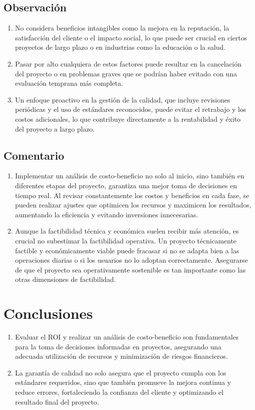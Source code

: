 \documentclass[12pt]{article}
\begin{document}
\subsection*{Observación}
\begin{enumerate}
    \item No considera beneficios intangibles como la mejora en la reputación, la satisfacción del cliente o el impacto social, lo que puede ser crucial en ciertos proyectos de largo plazo o en industrias como la educación o la salud. 
    \item  Pasar por alto cualquiera de estos factores puede resultar en la cancelación del proyecto o en problemas graves que se podrían haber evitado con una evaluación temprana más completa.
    \item Un enfoque proactivo en la gestión de la calidad, que incluye revisiones periódicas y el uso de estándares reconocidos, puede evitar el retrabajo y los costos adicionales, lo que contribuye directamente a la rentabilidad y éxito del proyecto a largo plazo.
\end{enumerate}

\subsection*{Comentario}
\begin{enumerate}
    \item Implementar un análisis de costo-beneficio no solo al inicio, sino también en diferentes etapas del proyecto, garantiza una mejor toma de decisiones en tiempo real. Al revisar constantemente los costos y beneficios en cada fase, se pueden realizar ajustes que optimicen los recursos y maximicen los resultados, aumentando la eficiencia y evitando inversiones innecesarias.
    \item Aunque la factibilidad técnica y económica suelen recibir más atención, es crucial no subestimar la factibilidad operativa. Un proyecto técnicamente factible y económicamente viable puede fracasar si no se adapta bien a las operaciones diarias o si los usuarios no lo adoptan correctamente. Asegurarse de que el proyecto sea operativamente sostenible es tan importante como las otras dimensiones de factibilidad.
\end{enumerate}

\section*{Conclusiones}
\begin{enumerate}
    \item Evaluar el ROI y realizar un análisis de costo-beneficio son fundamentales para la toma de decisiones informadas en proyectos, asegurando una adecuada utilización de recursos y minimización de riesgos financieros.
    \item La garantía de calidad no solo asegura que el proyecto cumpla con los estándares requeridos, sino que también promueve la mejora continua y reduce errores, fortaleciendo la confianza del cliente y optimizando el resultado final del proyecto.
\end{enumerate}
\end{document}
